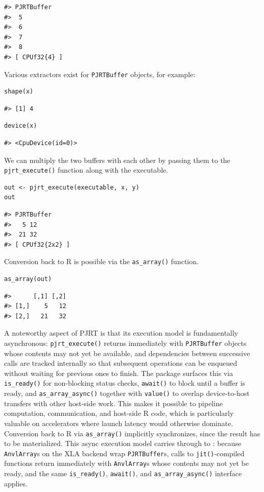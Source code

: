 \begin{verbatim}
#> PJRTBuffer 
#>  5
#>  6
#>  7
#>  8
#> [ CPUf32{4} ]
\end{verbatim}

Various extractors exist for \texttt{PJRTBuffer} objects, for example:

\begin{verbatim}
shape(x)
\end{verbatim}

\begin{verbatim}
#> [1] 4
\end{verbatim}

\begin{verbatim}
device(x)
\end{verbatim}

\begin{verbatim}
#> <CpuDevice(id=0)>
\end{verbatim}

We can multiply the two buffers with each other by passing them to the \texttt{pjrt\_execute()} function along with the executable.

\begin{verbatim}
out <- pjrt_execute(executable, x, y)
out
\end{verbatim}

\begin{verbatim}
#> PJRTBuffer 
#>   5 12
#>  21 32
#> [ CPUf32{2x2} ]
\end{verbatim}

Conversion back to R is possible via the \texttt{as\_array()} function.

\begin{verbatim}
as_array(out)
\end{verbatim}

\begin{verbatim}
#>      [,1] [,2]
#> [1,]    5   12
#> [2,]   21   32
\end{verbatim}

A noteworthy aspect of PJRT is that its execution model is fundamentally asynchronous: \texttt{pjrt\_execute()} returns immediately with \texttt{PJRTBuffer} objects whose contents may not yet be available, and dependencies between successive calls are tracked internally so that subsequent operations can be enqueued without waiting for previous ones to finish.
The  package surfaces this via \texttt{is\_ready()} for non-blocking status checks, \texttt{await()} to block until a buffer is ready, and \texttt{as\_array\_async()} together with \texttt{value()} to overlap device-to-host transfers with other host-side work.
This makes it possible to pipeline computation, communication, and host-side R code, which is particularly valuable on accelerators where launch latency would otherwise dominate.
Conversion back to R via \texttt{as\_array()} implicitly synchronizes, since the result has to be materialized.
This async execution model carries through to : because \texttt{AnvlArray}s on the XLA backend wrap \texttt{PJRTBuffer}s, calls to \texttt{jit()}-compiled  functions return immediately with \texttt{AnvlArray}s whose contents may not yet be ready, and the same \texttt{is\_ready()}, \texttt{await()}, and \texttt{as\_array\_async()} interface applies.

